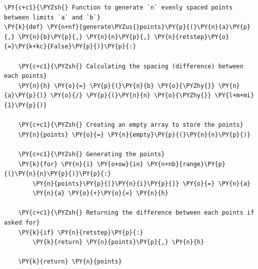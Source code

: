     \begin{tcolorbox}[breakable, size=fbox, boxrule=1pt, pad at break*=1mm,colback=cellbackground, colframe=cellborder]
\begin{Verbatim}[commandchars=\\\{\}]
\PY{c+c1}{\PYZsh{} Function to generate `n` evenly spaced points between limits `a` and `b`}
\PY{k}{def} \PY{n+nf}{generate\PYZus{}points}\PY{p}{(}\PY{n}{a}\PY{p}{,} \PY{n}{b}\PY{p}{,} \PY{n}{n}\PY{p}{,} \PY{n}{retstep}\PY{o}{=}\PY{k+kc}{False}\PY{p}{)}\PY{p}{:}

    \PY{c+c1}{\PYZsh{} Calculating the spacing (difference) between each points}
    \PY{n}{h} \PY{o}{=} \PY{p}{(}\PY{n}{b} \PY{o}{\PYZhy{}} \PY{n}{a}\PY{p}{)} \PY{o}{/} \PY{p}{(}\PY{n}{n} \PY{o}{\PYZhy{}} \PY{l+m+mi}{1}\PY{p}{)}

    \PY{c+c1}{\PYZsh{} Creating an empty array to store the points}
    \PY{n}{points} \PY{o}{=} \PY{n}{empty}\PY{p}{(}\PY{n}{n}\PY{p}{)}

    \PY{c+c1}{\PYZsh{} Generating the points}
    \PY{k}{for} \PY{n}{i} \PY{o+ow}{in} \PY{n+nb}{range}\PY{p}{(}\PY{n}{n}\PY{p}{)}\PY{p}{:}
        \PY{n}{points}\PY{p}{[}\PY{n}{i}\PY{p}{]} \PY{o}{=} \PY{n}{a}
        \PY{n}{a} \PY{o}{+}\PY{o}{=} \PY{n}{h}

    \PY{c+c1}{\PYZsh{} Returning the difference between each points if asked for}
    \PY{k}{if} \PY{n}{retstep}\PY{p}{:}
        \PY{k}{return} \PY{n}{points}\PY{p}{,} \PY{n}{h}

    \PY{k}{return} \PY{n}{points}
\end{Verbatim}
\end{tcolorbox}

